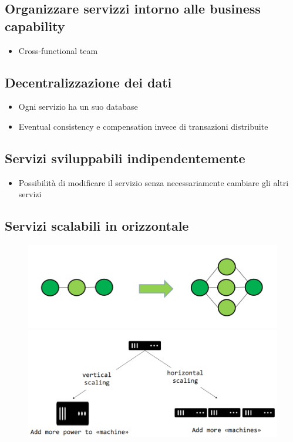 \documentclass[a4paper, 12pt]{report}
\begin{document}
          \subsection{Organizzare servizzi intorno alle business capability}
            \begin{itemize}
              \item Cross-functional team
            \end{itemize}
          \subsection{Decentralizzazione dei dati}
          \begin{itemize}
            \item Ogni servizio ha un suo database
            \item Eventual consistency e compensation invece di transazioni distribuite
          \end{itemize}
          \subsection{Servizi sviluppabili indipendentemente}
          \begin{itemize}
            \item Possibilità di modificare il servizio senza necessariamente cambiare gli altri servizi
          \end{itemize}
          \subsection{Servizi scalabili in orizzontale}
          \begin{figure}[htbp]
            \centering
            \includegraphics[scale=0.3]{Immagini/HScaling.png}
            \includegraphics[scale=0.3]{Immagini/HVScaling.png}
          \end{figure}
\end{document}
